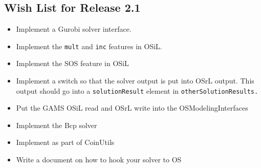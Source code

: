 \documentclass[11pt]{article}
\renewcommand{\_}{{\char"5F}}
\renewcommand{\{}{{\char"7B}}
\renewcommand{\}}{{\char"7D}}
\renewcommand{\^}{{\char"0D}}
\renewcommand{\'}{{\char"0D}}
\newcommand{\UrlKippFileupload}{http://gsbkip.chicagogsb.edu/os/fileupload.html}
\begin{document}
\begin{enumerate}[Step 1:]

{}



\section{Wish List for Release 2.1}\label{section:wishlist} 

\begin{itemize}
\item Implement a Gurobi solver interface.

\item Implement the {\tt mult} and {\tt inc} features in OSiL.

\item Implement the SOS feature in OSiL

\item Implement a switch so that the solver output is put into OSrL output. This output should go into a {\tt solutionResult} element in {\tt otherSolutionResults.}

\item Put the GAMS OSiL read and OSrL write into the OSModelingInterfaces

\item Implement the Bcp solver

\item Implement as part of CoinUtils

\item Write a document on how to hook your solver to OS


\end{itemize}
\end{enumerate}
\end{document}
